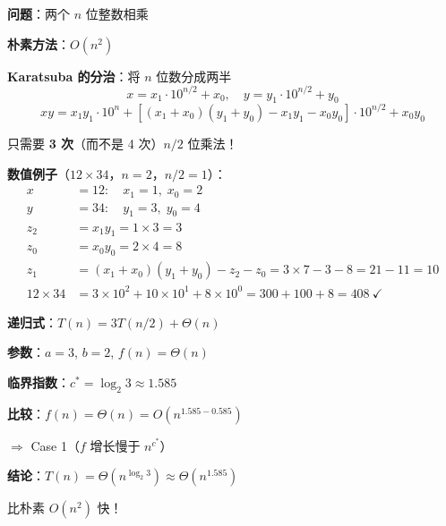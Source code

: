\documentclass[12pt, a4paper]{ctexart}
\begin{document}
\begin{blackboard}

\textbf{问题}：两个 $n$ 位整数相乘

\textbf{朴素方法}：$O(n^2)$

\textbf{Karatsuba 的分治}：将 $n$ 位数分成两半
\[
x = x_1 \cdot 10^{n/2} + x_0, \quad y = y_1 \cdot 10^{n/2} + y_0
\]
\[
xy = x_1 y_1 \cdot 10^n + [(x_1+x_0)(y_1+y_0) - x_1 y_1 - x_0 y_0] \cdot 10^{n/2} + x_0 y_0
\]

只需要 \textbf{3 次}（而不是 4 次）$n/2$ 位乘法！

\textbf{数值例子}（$12 \times 34$，$n=2$，$n/2=1$）：
\begin{align*}
x &= 12:\quad x_1 = 1,\; x_0 = 2 \\
y &= 34:\quad y_1 = 3,\; y_0 = 4 \\
z_2 &= x_1 y_1 = 1 \times 3 = 3 \\
z_0 &= x_0 y_0 = 2 \times 4 = 8 \\
z_1 &= (x_1+x_0)(y_1+y_0) - z_2 - z_0 = 3 \times 7 - 3 - 8 = 21 - 11 = 10 \\
12 \times 34 &= 3 \times 10^2 + 10 \times 10^1 + 8 \times 10^0 = 300 + 100 + 8 = 408\ \checkmark
\end{align*}

\textbf{递归式}：$T(n) = 3T(n/2) + \Theta(n)$

\textbf{参数}：$a = 3$, $b = 2$, $f(n) = \Theta(n)$

\textbf{临界指数}：$c^* = \log_2 3 \approx 1.585$

\textbf{比较}：$f(n) = \Theta(n) = O(n^{1.585 - 0.585})$

$\Rightarrow$ Case 1（$f$ 增长慢于 $n^{c^*}$）

\textbf{结论}：$T(n) = \Theta(n^{\log_2 3}) \approx \Theta(n^{1.585})$

比朴素 $O(n^2)$ 快！

\end{blackboard}
\end{document}

